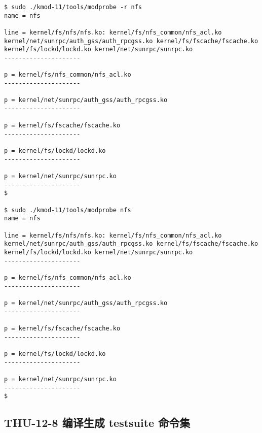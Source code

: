 \documentclass[11pt,a4paper]{article}
\begin{document}
{\begin{shaded}\begin{verbatim}
$ sudo ./kmod-11/tools/modprobe -r nfs
name = nfs

line = kernel/fs/nfs/nfs.ko: kernel/fs/nfs_common/nfs_acl.ko kernel/net/sunrpc/auth_gss/auth_rpcgss.ko kernel/fs/fscache/fscache.ko kernel/fs/lockd/lockd.ko kernel/net/sunrpc/sunrpc.ko
---------------------

p = kernel/fs/nfs_common/nfs_acl.ko
---------------------

p = kernel/net/sunrpc/auth_gss/auth_rpcgss.ko
---------------------

p = kernel/fs/fscache/fscache.ko
---------------------

p = kernel/fs/lockd/lockd.ko
---------------------

p = kernel/net/sunrpc/sunrpc.ko
---------------------
$ 

$ sudo ./kmod-11/tools/modprobe nfs
name = nfs

line = kernel/fs/nfs/nfs.ko: kernel/fs/nfs_common/nfs_acl.ko kernel/net/sunrpc/auth_gss/auth_rpcgss.ko kernel/fs/fscache/fscache.ko kernel/fs/lockd/lockd.ko kernel/net/sunrpc/sunrpc.ko
---------------------

p = kernel/fs/nfs_common/nfs_acl.ko
---------------------

p = kernel/net/sunrpc/auth_gss/auth_rpcgss.ko
---------------------

p = kernel/fs/fscache/fscache.ko
---------------------

p = kernel/fs/lockd/lockd.ko
---------------------

p = kernel/net/sunrpc/sunrpc.ko
---------------------
$ 
\end{verbatim}\end{shaded}}
\subsection{THU-12-8 编译生成 testsuite 命令集}

\subsubsection{}
\end{document}
